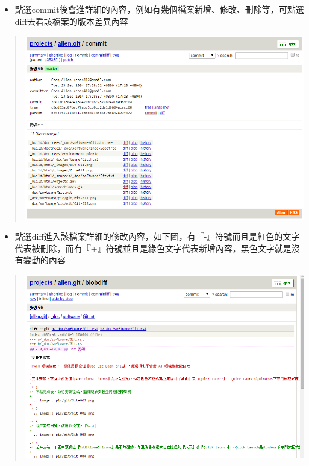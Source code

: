 \documentclass[letterpaper,10pt,english]{sphinxmanual}
\begin{document}
\begin{itemize}
\item {} 
點選commit後會進詳細的內容，例如有幾個檔案新增、修改、刪除等，可點選diff去看該檔案的版本差異內容

\end{itemize}
\begin{quote}

\includegraphics{gitweb-003.png}
\end{quote}
\begin{itemize}
\item {} 
點選diff進入該檔案詳細的修改內容，如下圖，有『-』符號而且是紅色的文字代表被刪除，而有『+』符號並且是綠色文字代表新增內容，黑色文字就是沒有變動的內容

\end{itemize}
\begin{quote}

\includegraphics{gitweb-004.png}
\end{quote}
\end{document}
